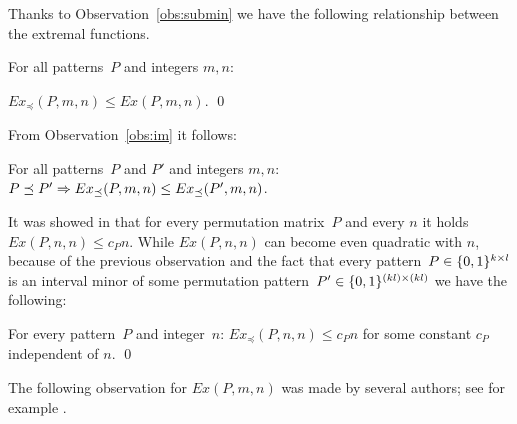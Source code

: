 Thanks to Observation~\ref{obs:submin} we have the following relationship between the extremal functions.

\begin{obs}
\label{obs:exm<ex}
For all patterns~$P$ and integers $m,n$:

$Ex_{\preceq}(P,m,n)\leq Ex(P,m,n)$. \qed
\end{obs}

From Observation~\ref{obs:im} it follows:

\begin{obs}
For all patterns~$P$ and $P'$ and integers $m,n$: $P\preceq P'\Rightarrow Ex_{\preceq}(P,m,n)\leq Ex_{\preceq}(P',m,n)$.
\end{obs}

It was showed in \cite{Marcus} that for every permutation matrix~$P$ and every $n$ it holds $Ex(P,n,n)\leq c_Pn$. While $Ex(P,n,n)$ can become even quadratic with $n$, because of the previous observation and the fact that every pattern~$P\in\{0,1\}^{k\times l}$ is an interval minor of some permutation pattern~$P'\in\{0,1\}^{(kl)\times(kl)}$ we have the following:

\begin{prop}
For every pattern~$P$ and integer~$n$: $Ex_{\preceq}(P,n,n)\leq c_Pn$ for some constant $c_P$ independent of $n$. \qed
\end{prop}

The following observation for $Ex(P,m,n)$ was made by several authors; see for example \cite{cibulka09, fulek}.

